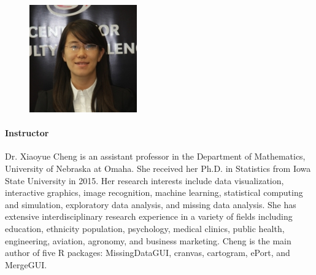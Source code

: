 \documentclass[11pt]{article}
\begin{document}
\begin{figure}
  \vspace{-25pt}
  \begin{center}
    \includegraphics[width=\linewidth]{Cheng-Xiaoyue.jpg}
  \end{center}  
  \vspace{-25pt}
\end{figure}
\paragraph{Instructor}
Dr. Xiaoyue Cheng is an assistant professor in the Department of
Mathematics, University of Nebraska at Omaha. She received her
Ph.D. in Statistics from Iowa State University in 2015. Her research
interests include data visualization, interactive graphics, image
recognition, machine learning, statistical computing and simulation,
exploratory data analysis, and missing data analysis. She has
extensive interdisciplinary research experience in a variety of fields
including education, ethnicity population, psychology, medical
clinics, public health, engineering, aviation, agronomy, and business
marketing. Cheng is the main author of five R packages:
\textsf{MissingDataGUI}, \textsf{cranvas}, \textsf{cartogram},
\textsf{ePort}, and \textsf{MergeGUI}.
\end{document}
